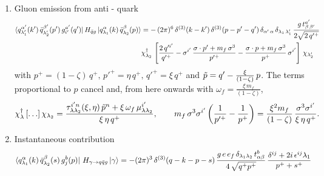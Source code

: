 \documentclass[9pt]{article}
\numberwithin{equation}{section}
\begin{document}
\begin{enumerate}
\begin{align}
\end{align}
\item  Gluon emission from anti - quark
\begin{align}
    \bra{q^{\alpha'}_{\lambda'_{1}}(k')\,\Bar{q}^{\beta'}_{\lambda'_{2}}(p')\,g^{a'}_{i'}(q')}H_{\Bar{q}g}\ket{q^{\alpha}_{\lambda_{1}}(k)\,\Bar{q}^{\beta}_{\lambda_{2}}(p)} & = -\,(2\pi)^{6}\, \delta^{(3)}(k-k')\, \delta^{(3)}(p-p'-q')\,\delta_{\alpha'\,\alpha}\,\delta_{\lambda_{1}\,\lambda'_{1}}\, \frac{g\,t^{a'}_{\beta\,\beta'}}{2\sqrt{2\,q'^{+}}} \notag \\ & \chi^{\dagger}_{\lambda_{2}}\,\left[\frac{2\,q'^{i'}}{q'^{+}}-\sigma^{i'}\,\frac{\sigma\cdot p' +m_{f}\,\sigma^{3}}{p'^{+}}-\frac{\sigma\cdot p +m_{f}\,\sigma^{3}}{p^{+}}\,\sigma^{i'}\right]\,\chi_{\lambda'_{2}}
\end{align}
with $p^{+} = (1-\zeta)\, q^{+},\, p'^{+} = \eta\,q^{+}, \, q'^{+} = \xi\,q^{+}$ and $\Tilde{p} = q' - \frac{\xi}{(1-\zeta)}\, p $. The terms proportional to $p$ cancel and, from here onwards with $\omega_{f} = \frac{\xi\, m_{f}}{(1-\zeta)}$,
$$\chi^{\dagger}_{\lambda}\left[\ldots\right]\chi_{\lambda_{2}} = \frac{\tau^{i'n}_{\lambda\lambda_{2}}(\xi,\eta)\,\Tilde{p}^{n}+\xi\,\omega_{f}\,\mu^{i'}_{\lambda\lambda_{2}}}{\xi\,\eta\,q^{+}},\hspace{2em} m_{f}\,\sigma^{3}\sigma^{i'}\left(\frac{1}{p'^{+}}-\frac{1}{p^{+}}\right) = \frac{\xi^{2}m_{f}}{(1-\zeta)}\,\frac{\sigma^{3}\sigma^{i'}}{\xi\,\eta\,q^{+}}.$$
\item  Instantaneous contribution
\begin{align}
    \bra{q^{\alpha}_{\lambda_{1}}(k)\,\Bar{q}^{\beta}_{\lambda_{2}}(s)\,g^{b}_{j}(p)}\,H_{\gamma\rightarrow q\Bar{q}g}\ket{\gamma} & = -(2\pi)^{3}\, \delta^{(3)}(q-k-p-s)\, \frac{g\,e\,e_{f}\,\delta_{\lambda_{1}\lambda_{2}}\,t^{b}_{\alpha\beta}}{4\,\sqrt{q^{+}p^{+}}}\, \frac{\delta^{ij}+2i\,\epsilon^{ij}\lambda_{1}}{p^{+}+s^{+}}
\end{align}
\end{enumerate}
\end{document}
